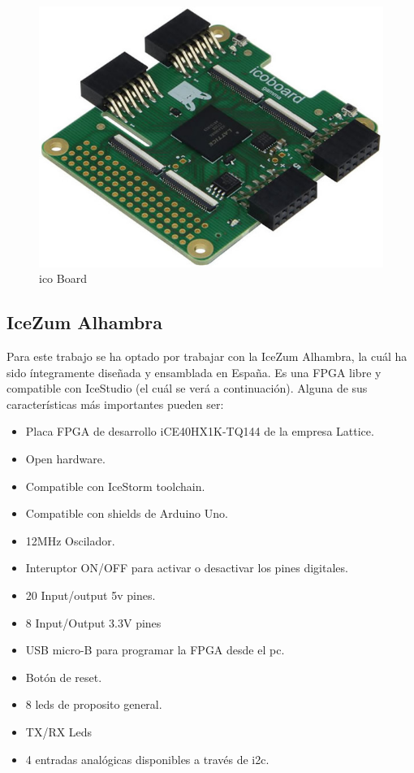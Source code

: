 \begin{center}
	\begin{figure}[H]
		\center
		\includegraphics[trim = 0mm 0mm 0mm 0mm, clip,scale=0.4]{imagenes/EstadoArte/ico_board.jpg}
		\caption{ico Board}
		\label{fig:icoBoard}
	\end{figure}
\end{center}
\subsection{IceZum Alhambra}
Para este trabajo se ha optado por trabajar con la IceZum Alhambra, la cuál ha sido íntegramente diseñada y ensamblada en España.\newline
Es una FPGA libre y compatible con IceStudio (el cuál se verá a continuación). Alguna de sus características más importantes pueden ser:
\begin{itemize}
	\item Placa FPGA de desarrollo iCE40HX1K-TQ144 de la empresa Lattice. 
	\item Open hardware.
	\item Compatible con IceStorm toolchain.
	\item Compatible con shields de Arduino Uno. 
	\item 12MHz Oscilador.
	\item Interuptor ON/OFF para activar o desactivar los pines digitales.
	\item 20 Input/output 5v pines.
	\item 8 Input/Output 3.3V pines
	\item USB micro-B para programar la FPGA desde el pc.
	\item Botón de reset.
	\item 8 leds de proposito general.
	\item TX/RX Leds
	\item 4 entradas analógicas disponibles a través de i2c.
\end{itemize}

